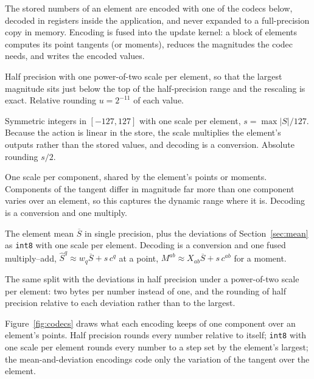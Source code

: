 \documentclass[sigconf,balance=false]{acmart}
\newcommand{\Sq}{\widehat{S}^{q}}
\newcommand{\Sbar}{\overline{S}}
\newcommand{\Mab}{M^{ab}}
\newcommand{\ucodec}{u}
\begin{document}
The stored numbers of an element are encoded with one of the codecs below, decoded in registers
inside the application, and never expanded to a full-precision copy in memory.  Encoding is fused
into the update kernel: a block of elements computes its point tangents (or moments), reduces the
magnitudes the codec needs, and writes the encoded values.

\begin{description}[leftmargin=1.5em,style=nextline]
\item[\texttt{fp16}, scaled.]  Half precision with one power-of-two scale per element, so that the
  largest magnitude sits just below the top of the half-precision range and the rescaling is
  exact.  Relative rounding $\ucodec = 2^{-11}$ of each value.
\item[\texttt{int8}, per element.]  Symmetric integers in $[-127,127]$ with one scale per element,
  $s=\max|S|/127$.  Because the action is linear in the store, the scale multiplies the element's
  outputs rather than the stored values, and decoding is a conversion.  Absolute rounding $s/2$.
\item[\texttt{int8}, per component.]  One scale per component, shared by the element's points or
  moments.  Components of the tangent differ in magnitude far more than one component varies over
  an element, so this captures the dynamic range where it is.  Decoding is a conversion and one
  multiply.
\item[\texttt{int8}, mean and deviation.]  The element mean $\Sbar$ in single precision, plus the
  deviations of Section~\ref{sec:mean} as \texttt{int8} with one scale per element.  Decoding is a conversion and one fused multiply--add,
  $\Sq\approx w_q\Sbar + s\,c^q$ at a point, $\Mab\approx X_{ab}\Sbar + s\,c^{ab}$ for a moment.
\item[\texttt{fp16}, mean and deviation.]  The same split with the deviations in half precision
  under a power-of-two scale per element: two bytes per number instead of one, and the rounding of
  half precision relative to each deviation rather than to the largest.
\end{description}

Figure~\ref{fig:codecs} draws what each encoding keeps of one component over an element's points.
Half precision rounds every number relative to itself; \texttt{int8} with one scale per element rounds
every number to a step set by the element's largest; the mean-and-deviation encodings code only the
variation of the tangent over the element.
\end{document}
